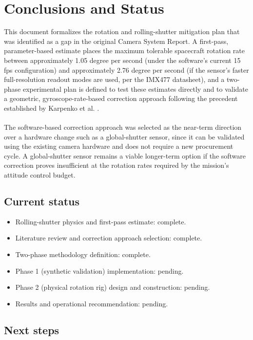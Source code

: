 \chapter{Conclusions and Status}

This document formalizes the rotation and rolling-shutter mitigation plan that was identified as a gap in the original Camera System Report. A first-pass, parameter-based estimate places the maximum tolerable spacecraft rotation rate between approximately 1.05 degree per second (under the software's current 15 fps configuration) and approximately 2.76 degree per second (if the sensor's faster full-resolution readout modes are used, per the IMX477 datasheet), and a two-phase experimental plan is defined to test these estimates directly and to validate a geometric, gyroscope-rate-based correction approach following the precedent established by Karpenko et al. \cite{karpenko2011rollingshutter}.
\\\\
The software-based correction approach was selected as the near-term direction over a hardware change such as a global-shutter sensor, since it can be validated using the existing camera hardware and does not require a new procurement cycle. A global-shutter sensor remains a viable longer-term option if the software correction proves insufficient at the rotation rates required by the mission's attitude control budget.

\section{Current status}

\begin{itemize}
    \item Rolling-shutter physics and first-pass estimate: complete.
    \item Literature review and correction approach selection: complete.
    \item Two-phase methodology definition: complete.
    \item Phase 1 (synthetic validation) implementation: pending.
    \item Phase 2 (physical rotation rig) design and construction: pending.
    \item Results and operational recommendation: pending.
\end{itemize}

\section{Next steps}

